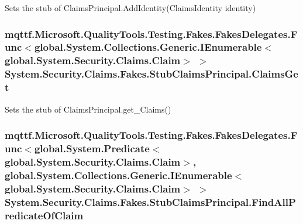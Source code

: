 Sets the stub of Claims\-Principal.\-Add\-Identity(\-Claims\-Identity identity)

\hypertarget{class_system_1_1_security_1_1_claims_1_1_fakes_1_1_stub_claims_principal_a70b7d63c3bbeecd74aedd83c6f12c42e}{
\subsubsection[{Claims\-Get}]{\setlength{\rightskip}{0pt plus 5cm}mqttf.\-Microsoft.\-Quality\-Tools.\-Testing.\-Fakes.\-Fakes\-Delegates.\-Func$<$global.\-System.\-Collections.\-Generic.\-I\-Enumerable$<$global.\-System.\-Security.\-Claims.\-Claim$>$ $>$ System.\-Security.\-Claims.\-Fakes.\-Stub\-Claims\-Principal.\-Claims\-Get}}\label{class_system_1_1_security_1_1_claims_1_1_fakes_1_1_stub_claims_principal_a70b7d63c3bbeecd74aedd83c6f12c42e}


Sets the stub of Claims\-Principal.\-get\-\_\-\-Claims()

\hypertarget{class_system_1_1_security_1_1_claims_1_1_fakes_1_1_stub_claims_principal_aac8a5f1d0a110a47290ba742899eb4c4}{
\subsubsection[{Find\-All\-Predicate\-Of\-Claim}]{\setlength{\rightskip}{0pt plus 5cm}mqttf.\-Microsoft.\-Quality\-Tools.\-Testing.\-Fakes.\-Fakes\-Delegates.\-Func$<$global.\-System.\-Predicate$<$global.\-System.\-Security.\-Claims.\-Claim$>$, global.\-System.\-Collections.\-Generic.\-I\-Enumerable$<$global.\-System.\-Security.\-Claims.\-Claim$>$ $>$ System.\-Security.\-Claims.\-Fakes.\-Stub\-Claims\-Principal.\-Find\-All\-Predicate\-Of\-Claim}}\label{class_system_1_1_security_1_1_claims_1_1_fakes_1_1_stub_claims_principal_aac8a5f1d0a110a47290ba742899eb4c4}


